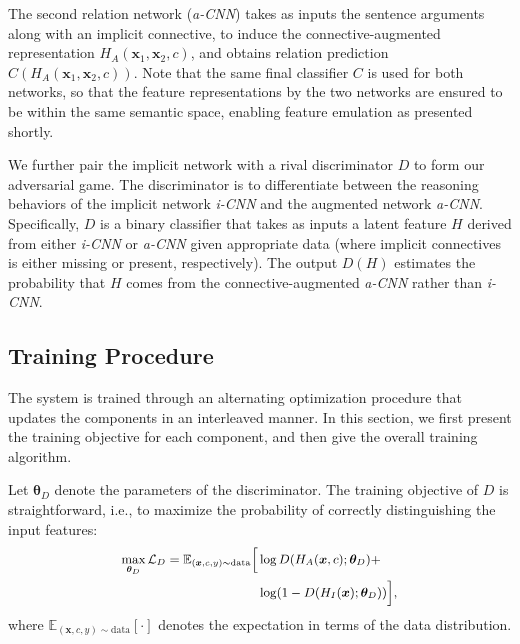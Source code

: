 \documentclass[11pt,a4paper]{article}
\newcommand{\E}{\mathbb{E}}
\begin{document}
The second relation network ({\it a-CNN}) takes as inputs the sentence arguments along with an implicit connective, to induce the connective-augmented representation $H_{A}(\bm{x}_1, \bm{x}_2, c)$, and obtains relation prediction $C(H_{A}(\bm{x}_1, \bm{x}_2, c))$. Note that the same final classifier $C$ is used for both networks, so that the feature representations by the two networks are ensured to be within the same semantic space, enabling feature emulation as presented shortly.

We further pair the implicit network with a rival discriminator $D$ to form our  adversarial game. The discriminator is to differentiate between the reasoning behaviors of the implicit network {\it i-CNN} and the augmented network {\it a-CNN}. Specifically, $D$ is a binary classifier that takes as inputs a latent feature $H$ derived from either {\it i-CNN} or {\it a-CNN} given appropriate data (where implicit connectives is either missing or present, respectively). The output $D(H)$ estimates the probability that $H$ comes from the connective-augmented {\it a-CNN} rather than {\it i-CNN}.

\subsection{Training Procedure}\label{sec:training}
The system is trained through an alternating optimization procedure that updates the components in an interleaved manner. In this section, we first present the training objective for each component, and then give the overall training algorithm. 

Let $\bm{\theta}_D$ denote the parameters of the discriminator. The training objective of $D$ is straightforward, i.e., to maximize the probability of correctly distinguishing the input features:
%
\begin{equation}\label{eq:d}
\small
\begin{split}
\max_{\bm{\theta}_D} \mathcal{L}_{D} = \E_{(\bm{x},c,y)\sim \text{data}} \Big[ &\log D(H_A(\bm{x},c); \bm{\theta}_D)  + \\
&\log (1 - D(H_I(\bm{x}); \bm{\theta}_D)) \Big],
\end{split}
\end{equation}
where $\E_{(\bm{x},c,y)\sim \text{data}} [\cdot]$ denotes the expectation in terms of the data distribution.
\end{document}

